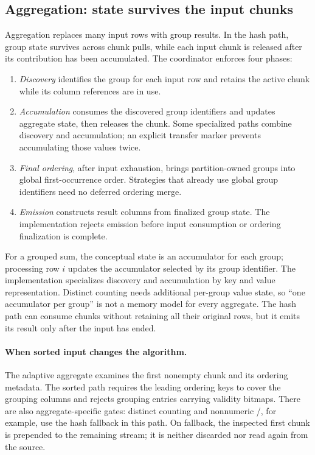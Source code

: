 \subsection{Aggregation: state survives the input chunks}
Aggregation replaces many input rows with group results. In the hash path,
group state survives across chunk pulls, while each input chunk is released
after its contribution has been accumulated. The coordinator enforces four
phases:
\begin{enumerate}
  \item \emph{Discovery} identifies the group for each input row and retains
    the active chunk while its column references are in use.
  \item \emph{Accumulation} consumes the discovered group identifiers and
    updates aggregate state, then releases the chunk. Some specialized paths
    combine discovery and accumulation; an explicit transfer marker prevents
    accumulating those values twice.
  \item \emph{Final ordering}, after input exhaustion, brings partition-owned
    groups into global first-occurrence order. Strategies that already use
    global group identifiers need no deferred ordering merge.
  \item \emph{Emission} constructs result columns from finalized group state.
    The implementation rejects emission before input consumption or ordering
    finalization is complete.
\end{enumerate}
For a grouped sum, the conceptual state is an accumulator for each group;
processing row $i$ updates the accumulator selected by its group identifier.
The implementation specializes discovery and accumulation by key and value
representation. Distinct counting needs additional per-group value state,
so ``one accumulator per group'' is not a memory model for every aggregate.
The hash path can consume chunks without retaining all their original rows,
but it emits its result only after the input has ended.

\paragraph{When sorted input changes the algorithm.}
The adaptive aggregate examines the first nonempty chunk and its ordering
metadata. The sorted path requires the leading ordering keys to cover the
grouping columns and rejects grouping entries carrying validity bitmaps.
There are also aggregate-specific gates: distinct counting and nonnumeric
/, for example, use the hash fallback in this path.
On fallback, the inspected first chunk is prepended to the remaining stream;
it is neither discarded nor read again from the source.

